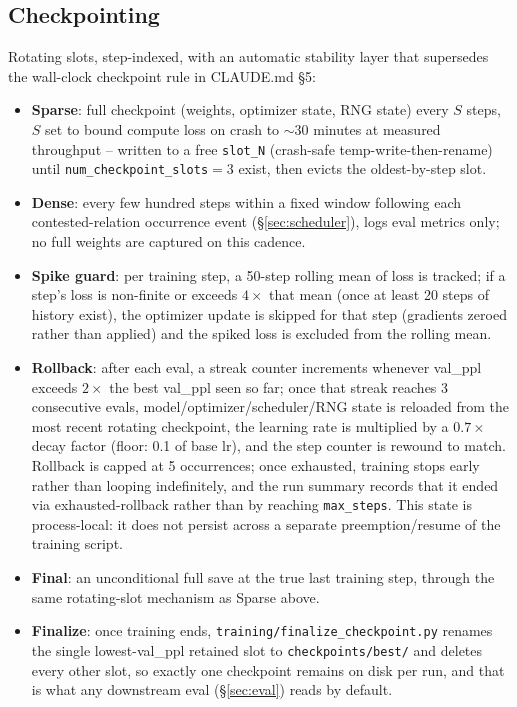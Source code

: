 \documentclass[11pt]{article}
\begin{document}
\subsection{Checkpointing}
\label{sec:checkpointing}

Rotating slots, step-indexed, with an automatic stability layer that
supersedes the wall-clock checkpoint rule in CLAUDE.md \S5:
\begin{itemize}
  \item \textbf{Sparse}: full checkpoint (weights, optimizer state, RNG
    state) every $S$ steps, $S$ set to bound compute loss on crash to
    $\sim$30 minutes at measured throughput -- written to a free
    \texttt{slot\_N} (crash-safe temp-write-then-rename) until
    \texttt{num\_checkpoint\_slots}$=3$ exist, then evicts the
    oldest-by-step slot.
  \item \textbf{Dense}: every few hundred steps within a fixed window
    following each contested-relation occurrence event
    (\S\ref{sec:scheduler}), logs eval metrics only; no full weights are
    captured on this cadence.
  \item \textbf{Spike guard}: per training step, a 50-step rolling mean of
    loss is tracked; if a step's loss is non-finite or exceeds $4\times$
    that mean (once at least 20 steps of history exist), the optimizer
    update is skipped for that step (gradients zeroed rather than applied)
    and the spiked loss is excluded from the rolling mean.
  \item \textbf{Rollback}: after each eval, a streak counter increments
    whenever val\_ppl exceeds $2\times$ the best val\_ppl seen so far; once
    that streak reaches 3 consecutive evals, model/optimizer/scheduler/RNG
    state is reloaded from the most recent rotating checkpoint, the
    learning rate is multiplied by a $0.7\times$ decay factor (floor: 0.1 of
    base lr), and the step counter is rewound to match. Rollback is capped
    at 5 occurrences; once exhausted, training stops early rather than
    looping indefinitely, and the run summary records that it ended via
    exhausted-rollback rather than by reaching \texttt{max\_steps}. This
    state is process-local: it does not persist across a separate
    preemption/resume of the training script.
  \item \textbf{Final}: an unconditional full save at the true last training
    step, through the same rotating-slot mechanism as Sparse above.
  \item \textbf{Finalize}: once training ends,
    \texttt{training/finalize\_checkpoint.py} renames the single
    lowest-val\_ppl retained slot to \texttt{checkpoints/best/} and deletes
    every other slot, so exactly one checkpoint remains on disk per run,
    and that is what any downstream eval (\S\ref{sec:eval}) reads by
    default.
\end{itemize}
\end{document}
